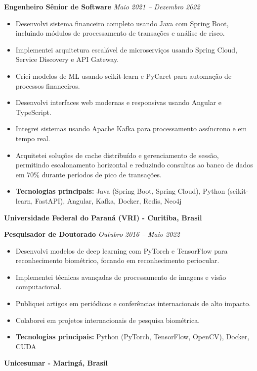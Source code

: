 \documentclass[12pt,a4paper,sans]{moderncv}
\begin{document}
\vspace{12pt}
\textbf{Engenheiro Sênior de Software} \hfill \textit{Maio 2021 -- Dezembro 2022}
\begin{itemize}
    \item Desenvolvi sistema financeiro completo usando Java com Spring Boot, incluindo módulos de processamento de transações e análise de risco.
    \item Implementei arquitetura escalável de microserviços usando Spring Cloud, Service Discovery e API Gateway.
    \item Criei modelos de ML usando scikit-learn e PyCaret para automação de processos financeiros.
    \item Desenvolvi interfaces web modernas e responsivas usando Angular e TypeScript.
    \item Integrei sistemas usando Apache Kafka para processamento assíncrono e em tempo real.
    \item Arquitetei soluções de cache distribuído e gerenciamento de sessão, permitindo escalonamento horizontal e reduzindo consultas ao banco de dados em 70\% durante períodos de pico de transações.
    \item \textbf{Tecnologias principais:} Java (Spring Boot, Spring Cloud), Python (scikit-learn, FastAPI), Angular, Kafka, Docker, Redis, Neo4j
\end{itemize}

\vspace{24pt}
\small{\textbf{Universidade Federal do Paraná (VRI) - Curitiba, Brasil}}
\vspace{3pt}

\textbf{Pesquisador de Doutorado} \hfill \textit{Outubro 2016 -- Maio 2022}
\begin{itemize}
    \item Desenvolvi modelos de deep learning com PyTorch e TensorFlow para reconhecimento biométrico, focando em reconhecimento periocular.
    \item Implementei técnicas avançadas de processamento de imagens e visão computacional.
    \item Publiquei artigos em periódicos e conferências internacionais de alto impacto.
    \item Colaborei em projetos internacionais de pesquisa biométrica.
    \item \textbf{Tecnologias principais:} Python (PyTorch, TensorFlow, OpenCV), Docker, CUDA
\end{itemize}

\vspace{24pt}
\small{\textbf{Unicesumar - Maringá, Brasil}}
\vspace{3pt}
\end{document}
